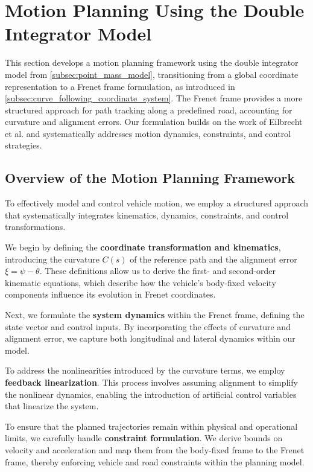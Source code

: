 \section{Motion Planning Using the Double Integrator Model} \label{sec:motion_planning_using_point_mass}

This section develops a motion planning framework using the double integrator model from \ref{subsec:point_mass_model}, transitioning from a global
coordinate representation to a Frenet frame formulation, as introduced in \ref{subsec:curve_following_coordinate_system}.
The Frenet frame provides a more structured approach for path tracking along a predefined road, accounting for curvature and alignment errors.
Our formulation builds on the work of Eilbrecht et al.
\cite{eilbrecht_challenges_2020} and systematically addresses motion dynamics, constraints, and control strategies.

\subsection{Overview of the Motion Planning Framework}

To effectively model and control vehicle motion, we employ a structured approach that systematically integrates kinematics, dynamics, constraints,
and control transformations.

We begin by defining the \textbf{coordinate transformation and kinematics}, introducing the curvature $C(s)$ of the reference path and the alignment
error $\xi = \psi - \theta$.
These definitions allow us to derive the first- and second-order kinematic equations, which describe how the vehicle's body-fixed velocity components
influence its evolution in Frenet coordinates.

Next, we formulate the \textbf{system dynamics} within the Frenet frame, defining the state vector and control inputs.
By incorporating the effects of curvature and alignment error, we capture both longitudinal and lateral dynamics within our model.

To address the nonlinearities introduced by the curvature terms, we employ \textbf{feedback linearization}.
This process involves assuming alignment to simplify the nonlinear dynamics, enabling the introduction of artificial control variables that linearize
the system.

To ensure that the planned trajectories remain within physical and operational limits, we carefully handle \textbf{constraint formulation}.
We derive bounds on velocity and acceleration and map them from the body-fixed frame to the Frenet frame, thereby enforcing vehicle and road
constraints within the planning model.

